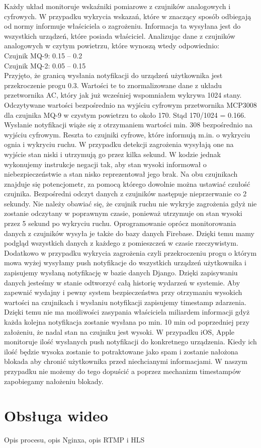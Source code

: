 Każdy układ monitoruje wskaźniki pomiarowe z czujników analogowych i cyfrowych. W przypadku wykrycia wskazań, które w znaczący sposób odbiegają od normy informuje właściciela o zagrożeniu. Informacja ta wysyłana jest do wszystkich urządzeń, które posiada właściciel.  Analizując dane z czujników analogowych w czytym powietrzu, które wynoszą wtedy odpowiednio:\\
Czujnik MQ-9: 0.15 – 0.2\\
Czujnik MQ-2: 0.05 – 0.15\\
Przyjęto, że granicą wysłania notyfikacji do urządzeń użytkownika jest przekroczenie progu 0.3. Wartości te to znormalizowane dane z układu przetwornika AC, który jak już wcześniej wspomniałem wykrywa 1024 stany. Odczytywane wartości bezpośrednio na wyjściu cyfrowym przetwornika MCP3008 dla czujnika MQ-9 w czystym powietrzu to około 170. Stąd 170/1024 = 0.166. Wysłanie notyfikacji wiąże się z otrzymaniem wartości min. 308 bezpośrednio na wyjściu cyfrowym.
Reszta to czujniki cyfrowe, które informują m.in. o wykryciu ognia i wykryciu ruchu. W przypadku detekcji zagrożenia wysyłają one na wyjście stan niski i utrzymują go przez kilka sekund. W kodzie jednak wykonujemy instrukcje negacji tak, aby stan wysoki informował o niebezpieczeństwie a stan nisko reprezentował jego brak. Na obu czujnikach znajduje się potencjometr, za pomocą którego dowolnie można ustawiać czułość czujnika.
Bezpośredni odczyt danych z czujników następuje nieprzerwanie co 2 sekundy. Nie należy obawiać się, że czujnik ruchu nie wykryje zagrożenia gdyż nie zostanie odczytany w poprawnym czasie, ponieważ utrzymuje on stan wysoki przez 5 sekund po wykryciu ruchu.
Oprogramowanie oprócz monitorowania danych z czujników wysyła je także do bazy danych Firebase. Dzięki temu mamy podgląd wszystkich danych z każdego z pomieszczeń w czasie rzeczywistym. Dodatkowo w przypadku wykrycia zagrożenia czyli przekroczeniu progu o którym mowa wyżej wysyłamy push notyfikacje do wszystkich urządzeń użytkownika i zapisujemy wysłaną notyfikację w bazie danych Django. Dzięki zapisywaniu danych jesteśmy w stanie odtworzyć całą historię wydarzeń w systemie.
Aby zapewnić wydajny i pewny system bezpieczeństwa przy otrzymaniu wysokich wartości na czujnikach i wysłaniu notyfikacji zapisujemy timestamp zdarzenia. Dzięki temu nie ma możliwości zasypania właściciela miliardem informacji gdyż każda kolejna notyfikacja zostanie wysłana po min. 10 min od poprzedniej przy założeniu, że nadal stan na czujniku jest wysoki.
W przypadku iOS, Apple monitoruje ilość wysłanych push notyfikacji do konkretnego urządzenia. Kiedy ich ilość będzie wysoka zostanie to potraktowane jako spam i zostanie nałożona blokada aby chronić użytkownika przed niechcianymi informacjami. W naszym przypadku nie możemy do tego dopuścić a poprzez mechanizm timestampów zapobiegamy nałożeniu blokady.




















\section*{Obsługa wideo}

Opis procesu, opis Nginxa, opis RTMP i HLS